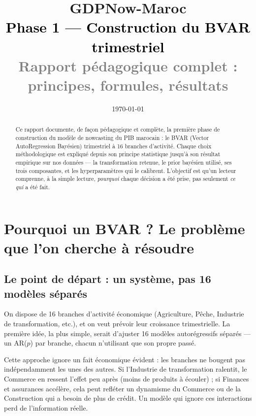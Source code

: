 \documentclass[11pt,a4paper]{article}
\title{\vspace{-1.3cm}\textcolor{bleuprincip}{\Huge\bfseries GDPNow-Maroc}\\[0.3cm]
\textcolor{black}{\Large Phase 1 --- Construction du BVAR trimestriel}\\[0.15cm]
\textcolor{gray}{\large Rapport pédagogique complet : principes, formules, résultats}}
\author{}
\date{\today}
\begin{document}
\maketitle
\thispagestyle{empty}

\begin{abstract}
\noindent Ce rapport documente, de façon pédagogique et complète, la première phase de construction du modèle de nowcasting du PIB marocain : le BVAR (Vector AutoRegression Bayésien) trimestriel à 16 branches d'activité. Chaque choix méthodologique est expliqué depuis son principe statistique jusqu'à son résultat empirique sur nos données --- la transformation retenue, le prior bayésien utilisé, ses trois composantes, et les hyperparamètres qui le calibrent. L'objectif est qu'un lecteur comprenne, à la simple lecture, \emph{pourquoi} chaque décision a été prise, pas seulement \emph{ce qui} a été fait.
\end{abstract}

\tableofcontents
\vspace{0.5cm}

\section{Pourquoi un BVAR ? Le problème que l'on cherche à résoudre}

\subsection{Le point de départ : un système, pas 16 modèles séparés}

On dispose de 16 branches d'activité économique (Agriculture, Pêche, Industrie de transformation, etc.), et on veut prévoir leur croissance trimestrielle. La première idée, la plus simple, serait d'ajuster 16 modèles autorégressifs séparés --- un AR($p$) par branche, chacun n'utilisant que son propre passé.

\begin{intuition}
Cette approche ignore un fait économique évident : les branches ne bougent pas indépendamment les unes des autres. Si l'Industrie de transformation ralentit, le Commerce en ressent l'effet peu après (moins de produits à écouler) ; si Finances et assurances accélère, cela peut refléter un dynamisme du Commerce ou de la Construction qui a besoin de plus de crédit. Un modèle qui ignore ces interactions perd de l'information réelle.
\end{intuition}
\end{document}

